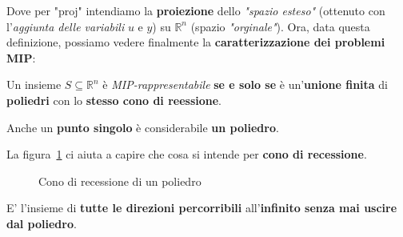 Dove per "$\text{proj}$" intendiamo la \textbf{proiezione} dello 
\textit{"spazio esteso"} (ottenuto con l'\textit{aggiunta delle variabili} $u$ e $y$) 
su $\mathbb{R}^n$ (spazio \textit{"orginale"}). 
Ora, data questa definizione, possiamo vedere finalmente la 
\textbf{caratterizzazione dei problemi MIP}:

\begin{theorem}
    Un insieme $S\subseteq \mathbb{R}^n$ è \textit{MIP-rappresentabile}
    \textbf{se e solo se} è un'\textbf{unione finita} di
    \textbf{poliedri} con lo \textbf{stesso cono di reessione}.
\end{theorem}

\begin{remark}
    Anche un \textbf{punto singolo} è considerabile \textbf{un poliedro}.
\end{remark}

La figura~\ref{fig:04_09_ConoRecessione} ci aiuta a capire che cosa
si intende per \textbf{cono di recessione}.

\begin{figure}[!ht]
    \centering
    \caption{Cono di recessione di un poliedro}
    \label{fig:04_09_ConoRecessione}
\end{figure}

\begin{definition}
    E' l'insieme di \textbf{tutte le direzioni percorribili}
    all'\textbf{infinito senza mai uscire dal poliedro}.
\end{definition}

